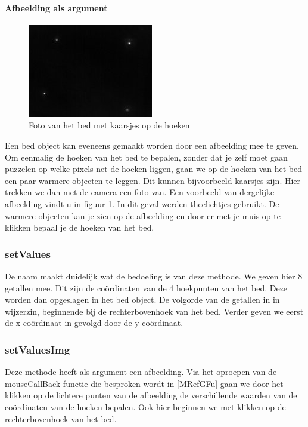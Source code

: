 \paragraph{Afbeelding als argument}
\begin{figure}[h]
	\includegraphics[scale=0.75]{SeekCamBed}
	\caption{Foto van het bed met kaarsjes op de hoeken}
	\label{imgCBe}
\end{figure}
Een bed object kan eveneens gemaakt worden door een afbeelding mee te geven. Om eenmalig de hoeken van het bed te bepalen, zonder dat je zelf moet gaan puzzelen op welke pixels net de hoeken liggen, gaan we op de hoeken van het bed een paar warmere objecten  te leggen. Dit kunnen bijvoorbeeld kaarsjes zijn. Hier trekken we dan met de camera een foto van. Een voorbeeld van dergelijke afbeelding vindt u in figuur \ref{imgCBe}. In dit geval werden theelichtjes gebruikt. De warmere objecten kan je zien op de afbeelding en door er met je muis op te klikken bepaal je de hoeken van het bed.

\subsubsection{setValues}
De naam maakt duidelijk wat de bedoeling is van deze methode. We geven hier 8 getallen mee. Dit zijn de co\"ordinaten van de 4 hoekpunten van het bed. Deze worden dan opgeslagen in het bed object. De volgorde van de getallen in in wijzerzin, beginnende bij de rechterbovenhoek van het bed. Verder geven we eerst de x-co\"ordinaat in gevolgd door de y-co\"ordinaat.

\subsubsection{setValuesImg}
Deze methode heeft als argument een afbeelding. Via het oproepen van de mouseCallBack functie die besproken wordt in \ref{MRefGFu} gaan we door het klikken op de lichtere punten van de afbeelding de verschillende waarden van de co\"ordinaten van de hoeken bepalen. Ook hier beginnen we met klikken op de rechterbovenhoek van het bed. 

